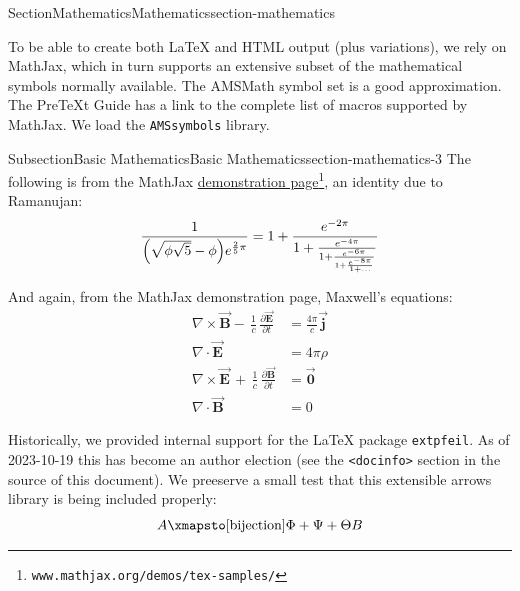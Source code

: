 \documentclass[twoside,10pt,]{article}
\newcommand{\mono}[1]{\texttt{#1}}
\numberwithin{equation}{section}
\begin{document}
\begin{sectionptx}{Section}{Mathematics}{}{Mathematics}{}{}{section-mathematics}
\begin{introduction}{}%
To be able to create both \LaTeX{} and HTML output (plus variations), we rely on MathJax, which in turn supports an extensive subset of the mathematical symbols normally available.  The AMSMath symbol set is a good approximation.  The PreTeXt Guide has a link to the complete list of macros supported by MathJax.  We load the \mono{AMSsymbols} library.%
\end{introduction}%
%
%
\typeout{************************************************}
\typeout{************************************************}
%
\begin{subsectionptx}{Subsection}{Basic Mathematics}{}{Basic Mathematics}{}{}{section-mathematics-3}
The following is from the MathJax \href{http://www.mathjax.org/demos/tex-samples/}{demonstration page}\footnote{\nolinkurl{www.mathjax.org/demos/tex-samples/}\label{section-mathematics-3-2-2}}, an identity due to Ramanujan:%
\begin{equation*}
\frac{1}{\Bigl(\sqrt{\phi \sqrt{5}}-\phi\Bigr) e^{\frac25 \pi}} = 1+\frac{e^{-2\pi}} {1+\frac{e^{-4\pi}} {1+\frac{e^{-6\pi}} {1+\frac{e^{-8\pi}} {1+\ldots} } } }
\end{equation*}
%
\par
And again, from the MathJax demonstration page, Maxwell's equations:%
\begin{align*}
\nabla \times \vec{\mathbf{B}} -\, \frac1c\, \frac{\partial\vec{\mathbf{E}}}{\partial t} & = \frac{4\pi}{c}\vec{\mathbf{j}}\\
\nabla \cdot \vec{\mathbf{E}} & = 4 \pi \rho\\
\nabla \times \vec{\mathbf{E}}\, +\, \frac1c\, \frac{\partial\vec{\mathbf{B}}}{\partial t} & = \vec{\mathbf{0}}\\
\nabla \cdot \vec{\mathbf{B}} & = 0
\end{align*}
\label{section-mathematics-3-3-3}%
\par
Historically, we provided internal support for the \LaTeX{} package \mono{extpfeil}.  As of 2023-10-19 this has become an author election (see the \mono{<docinfo>} section in the source of this document).  We preeserve a small test that this extensible arrows library is being included properly:%
\begin{equation*}
A\xmapsto[\text{bijection}]{\Phi+\Psi+\Theta}B
\end{equation*}

\end{subsectionptx}
\end{sectionptx}
\end{document}
